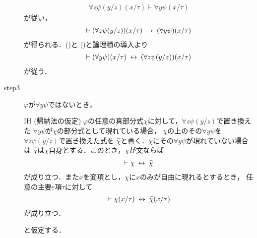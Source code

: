 \begin{sketch}
\begin{description}
				\begin{align}
					\forall z \psi(y/z)(x/\tau) \vdash \forall y \psi(x/\tau)
				\end{align}
				が従い，
				\begin{align}
					\vdash (\forall z \psi(y/z))(x/\tau) \hspace{0.25em}\rightarrow\hspace{0.25em} (\forall y \psi)(x/\tau)
					\label{fom:equivalence_by_replacing_bound_variables_4}
				\end{align}
				が得られる．()と
				()と論理積の導入より
				\begin{align}
					\vdash (\forall y \psi)(x/\tau) \hspace{0.25em}\leftrightarrow\hspace{0.25em} (\forall z \psi(y/z))(x/\tau)
				\end{align}
				が従う．
				
			\item[step3]
				$\varphi$が$\forall y \psi$ではないとき，
				\begin{itembox}[l]{IH (帰納法の仮定)}
					$\varphi$の任意の真部分式$\chi$に対して，$\forall z \psi(y/z)$で置き換えた
					$\forall y \psi$が$\chi$の部分式として現れている場合，
					$\chi$の上のその$\forall y \psi$を$\forall z \psi(y/z)$で置き換えた式を
					$\widehat{\chi}$と書く．$\chi$にその$\forall y \psi$が現れていない場合は
					$\widehat{\chi}$は$\chi$自身とする．このとき，$\chi$が文ならば
					\begin{align}
						\vdash \chi \hspace{0.25em}\leftrightarrow\hspace{0.25em} \widehat{\chi}
					\end{align}
					が成り立つ\footnotemark．また$x$を変項とし，$\chi$に$x$のみが自由に現れるとするとき，
					任意の主要$\varepsilon$項$\tau$に対して
					\begin{align}
						\vdash \chi(x/\tau) \hspace{0.25em}\leftrightarrow\hspace{0.25em} \widehat{\chi}(x/\tau)
					\end{align}
					が成り立つ．
				\end{itembox}
				と仮定する．
			
				

\end{description}
\end{sketch}

